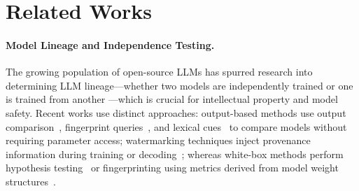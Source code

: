 \section{Related Works}\label{s:related_work}

\noindent\paragraph{Model Lineage and Independence Testing.}
The growing population of open-source LLMs has spurred research into determining LLM lineage—whether two models are independently trained or one is trained from another —which is crucial for intellectual property and model safety. Recent works use distinct approaches: output-based methods use output comparison~\citep{Nikolic2025model}, fingerprint queries~\citep{jin2024proflingo}, and lexical cues~\citep{sun2025idiosyncrasies, wu-etal-2023-llmdet} to compare models without requiring parameter access; watermarking techniques inject
provenance information during training or decoding~\citep{wang2019attacks, Uchida2017embedding, Gu2022WatermarkingPL, jiang2025stealthink}; whereas white-box methods perform hypothesis testing~\citep{zhu2025independence} or fingerprinting using metrics derived from model weight structures~\citep{zeng2024HuRef, zeng2025awm, wang2025ghost, yoon2025intrinsic}. 



